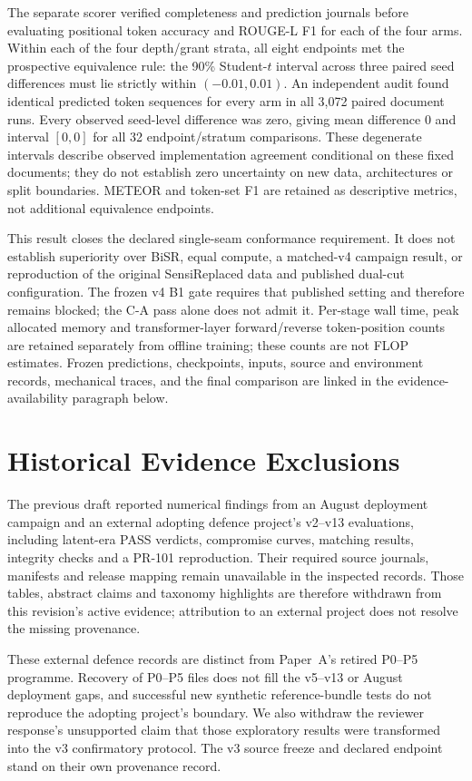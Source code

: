 \documentclass[11pt]{article}
\begin{document}
The separate scorer verified completeness and prediction journals before evaluating positional token accuracy and ROUGE-L F1 for each of the four arms. Within each of the four depth/grant strata, all eight endpoints met the prospective equivalence rule: the 90\% Student-$t$ interval across three paired seed differences must lie strictly within $(-0.01,0.01)$. An independent audit found identical predicted token sequences for every arm in all 3{,}072 paired document runs. Every observed seed-level difference was zero, giving mean difference 0 and interval $[0,0]$ for all 32 endpoint/stratum comparisons. These degenerate intervals describe observed implementation agreement conditional on these fixed documents; they do not establish zero uncertainty on new data, architectures or split boundaries. METEOR and token-set F1 are retained as descriptive metrics, not additional equivalence endpoints.

This result closes the declared single-seam conformance requirement. It does not establish superiority over BiSR, equal compute, a matched-v4 campaign result, or reproduction of the original SensiReplaced data and published dual-cut configuration. The frozen v4 B1 gate requires that published setting and therefore remains blocked; the C-A pass alone does not admit it. Per-stage wall time, peak allocated memory and transformer-layer forward/reverse token-position counts are retained separately from offline training; these counts are not FLOP estimates. Frozen predictions, checkpoints, inputs, source and environment records, mechanical traces, and the final comparison are linked in the evidence-availability paragraph below.

\section{Historical Evidence Exclusions}
\label{sec:campaign}
\label{sec:repro}
The previous draft reported numerical findings from an August deployment campaign and an external adopting defence project's v2--v13 evaluations, including latent-era PASS verdicts, compromise curves, matching results, integrity checks and a PR-101 reproduction. Their required source journals, manifests and release mapping remain unavailable in the inspected records. Those tables, abstract claims and taxonomy highlights are therefore withdrawn from this revision's active evidence; attribution to an external project does not resolve the missing provenance.

These external defence records are distinct from Paper~A's retired P0--P5 programme. Recovery of P0--P5 files does not fill the v5--v13 or August deployment gaps, and successful new synthetic reference-bundle tests do not reproduce the adopting project's boundary. We also withdraw the reviewer response's unsupported claim that those exploratory results were transformed into the v3 confirmatory protocol. The v3 source freeze and declared endpoint stand on their own provenance record.
\end{document}
